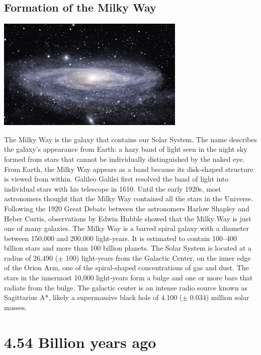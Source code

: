 \documentclass[11pt]{report}
\begin{document}
\section{Formation of the Milky Way}
\vspace{2mm}\begin{center}\includegraphics[width=9cm]{./img/milkyway.jpg}\end{center}
The Milky Way is the galaxy that contains our Solar System. The name describes the galaxy's appearance from Earth: a hazy band of light seen in the night sky formed from stars that cannot be individually distinguished by the naked eye. From Earth, the Milky Way appears as a band because its disk-shaped structure is viewed from within. Galileo Galilei first resolved the band of light into individual stars with his telescope in 1610. Until the early 1920s, most astronomers thought that the Milky Way contained all the stars in the Universe. Following the 1920 Great Debate between the astronomers Harlow Shapley and Heber Curtis, observations by Edwin Hubble showed that the Milky Way is just one of many galaxies. The Milky Way is a barred spiral galaxy with a diameter between 150,000 and 200,000 light-years. It is estimated to contain 100$–$400 billion stars and more than 100 billion planets. The Solar System is located at a radius of 26,490 ($\pm$ 100) light-years from the Galactic Center, on the inner edge of the Orion Arm, one of the spiral-shaped concentrations of gas and dust. The stars in the innermost 10,000 light-years form a bulge and one or more bars that radiate from the bulge. The galactic center is an intense radio source known as Sagittarius A*, likely a supermassive black hole of 4.100 ($\pm$ 0.034) million solar masses.

\chapter{4.54 Billion years ago}
\end{document}
